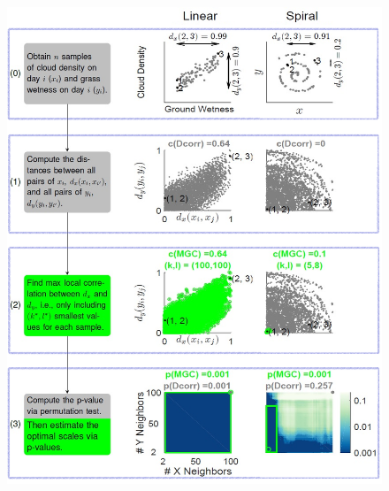 \documentclass[11pt]{article}
\begin{document}
\begin{figure}
\includegraphics[width=1.0\textwidth]{Figures/Fig1All.png}
\caption{}
\label{f:newschem}
\end{figure}
\end{document}
